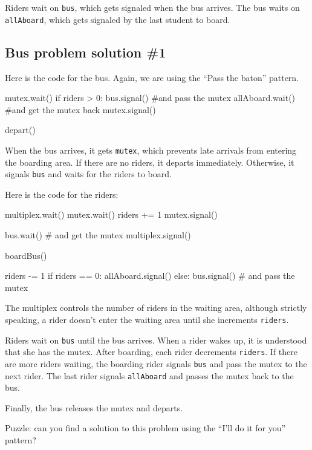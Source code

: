 \documentclass{book}
\begin{document}
Riders wait on
    {\tt bus}, which gets signaled when the bus arrives.  The
bus waits on {\tt allAboard}, which gets signaled by the last
student to board.



\subsection {Bus problem solution \#1}

Here is the code for the bus.  Again, we are using the
``Pass the baton'' pattern.


\begin{unbreakable}[title={Bus problem solution (bus)}]{}
mutex.wait()
if riders > 0:
 bus.signal() #and pass the mutex
 allAboard.wait() #and get the mutex back
mutex.signal()

depart()
\end{unbreakable}

When the bus arrives, it gets {\tt mutex}, which
prevents late arrivals from entering the boarding area.  If there
are no riders, it departs immediately.  Otherwise, it signals {\tt bus}
and waits for the riders to board.

Here is the code for the riders:


\begin{unbreakable}[title={Bus problem solution (riders)}]{}
multiplex.wait()
    mutex.wait()
        riders += 1
    mutex.signal()

    bus.wait()  # and get the mutex
multiplex.signal()

boardBus()

riders -= 1
if riders == 0:
    allAboard.signal() 
else:
    bus.signal() # and pass the mutex
\end{unbreakable}

The multiplex controls the number of riders in the waiting area,
although strictly speaking, a rider doesn't enter the waiting
area until she increments {\tt riders}.

Riders wait on {\tt bus} until the bus arrives.  When a rider
wakes up, it is understood that she has the mutex.
After boarding, each rider decrements {\tt riders}.  If there
are more riders waiting, the boarding rider signals {\tt bus}
and pass the mutex to the next rider.  The last rider signals
    {\tt allAboard} and passes the mutex back to the bus.

Finally, the bus releases the mutex and departs.

Puzzle: can you find a solution to this problem using the
``I'll do it for you'' pattern?
\end{document}
